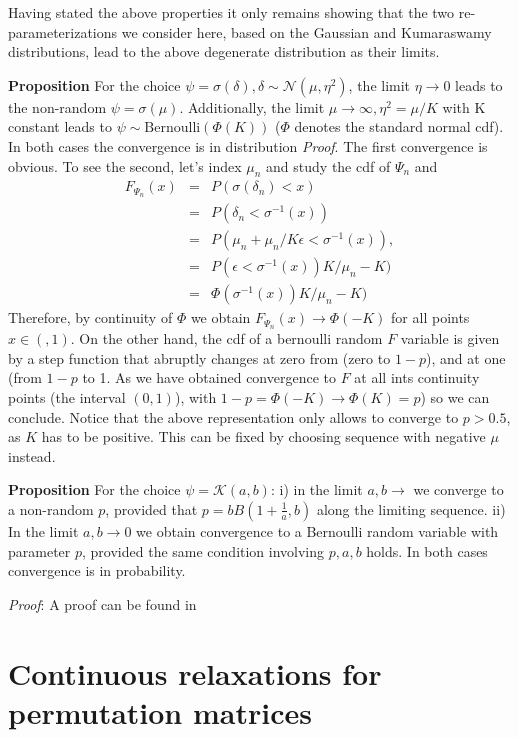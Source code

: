 \documentclass{article}
\begin{document}
Having stated the above properties it only remains showing that the two re-parameterizations we consider here, based on the Gaussian and Kumaraswamy distributions, lead to the above degenerate distribution as their limits.

\textbf{Proposition} For the choice $\psi=\sigma(\delta),\delta\sim\mathcal{N}(\mu,\eta^2)$, the limit $\eta\rightarrow 0$ leads to the non-random $\psi=\sigma(\mu)$. Additionally, the limit $\mu\rightarrow \infty, \eta^2=\mu/K$ with K constant leads to $\psi\sim \text{Bernoulli}(\Phi(K))$ ($\Phi$ denotes the standard normal cdf). In both cases the convergence is in distribution \textit{Proof}. The first convergence is obvious. To see the second, let's index $\mu_n$ and  study the cdf of $\Psi_n$ and 
\begin{align}F_{\Psi_n}(x)&=& P(\sigma(\delta_n)<x) \\
&=&P(\delta_n< \sigma^{-1}(x))\\
&=& P(\mu_n +\mu_n/K\epsilon <\sigma^{-1}(x)),\\\
&=& P( \epsilon <\sigma^{-1}(x))K/\mu_n -K)\\
&=& \Phi( \sigma^{-1}(x))K/\mu_n -K) 
\end{align}
Therefore, by continuity of $\Phi$ we obtain $F_{\Psi_n}(x)\rightarrow \Phi(-K)$ for all points $x\in(,1)$. On the other hand, the cdf of a bernoulli random $F$ variable is given by  a step function that abruptly changes at zero from (zero to $1-p$), and at one (from $1-p$ to 1. As we have obtained convergence to $F$ at all ints continuity points (the interval $(0,1)$), with $1-p= \Phi(-K)\rightarrow \Phi(K)=p$) so we can conclude. Notice that the above representation only allows   to converge to $p>0.5$, as $K$ has to be positive. This can be fixed by choosing sequence with negative $\mu$ instead.

\textbf{Proposition} For the choice $\psi=\mathcal{K}(a,b)$: i) in the limit $a,b \rightarrow $  we converge to a non-random $p$, provided that $p=bB\left(1+\frac{1}{a},b\right)$ along the limiting sequence. ii) In the limit $a,b\rightarrow 0$ we obtain convergence to a Bernoulli random variable with parameter $p$, provided the same condition involving $p,a,b$ holds. In both cases convergence is in probability.


\textit{Proof}: A proof can be found in \cite{mitnik2013kumar}



\section{Continuous relaxations for permutation matrices}
\label{sec:permutation}
\end{document}
